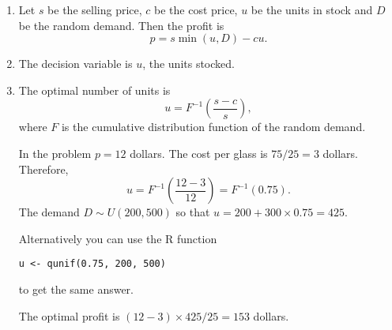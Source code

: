 \documentclass{article}
\begin{document}
\begin{enumerate}
\item
Let $s$ be the selling price, $c$ be the cost price, $u$ be the units in stock
and $D$ be the random demand. Then the profit is
\begin{equation}
p = s \min(u, D) - cu.
\end{equation}

\item The decision variable is $u$, the units stocked.

\item The optimal number of units is
\begin{equation}
u = F^{-1}\left(\frac{s - c}{s}\right),
\end{equation}
where $F$ is the cumulative distribution function of the random demand.

In the problem $p = 12$ dollars. The cost per glass is $75/25 = 3$ 
dollars. Therefore, 
\begin{equation}
u = F^{-1}\left(\frac{12 - 3}{12}\right) = F^{-1}(0.75).
\end{equation}
The demand $D \sim U(200, 500)$ so that $u = 200 + 300 \times 0.75 = 425$. 

Alternatively you can use the R function 
\begin{verbatim}
u <- qunif(0.75, 200, 500)
\end{verbatim}
to get the same answer.

The optimal profit is $(12 - 3) \times 425/25 = 153$ dollars.
\end{enumerate}
\end{document}
